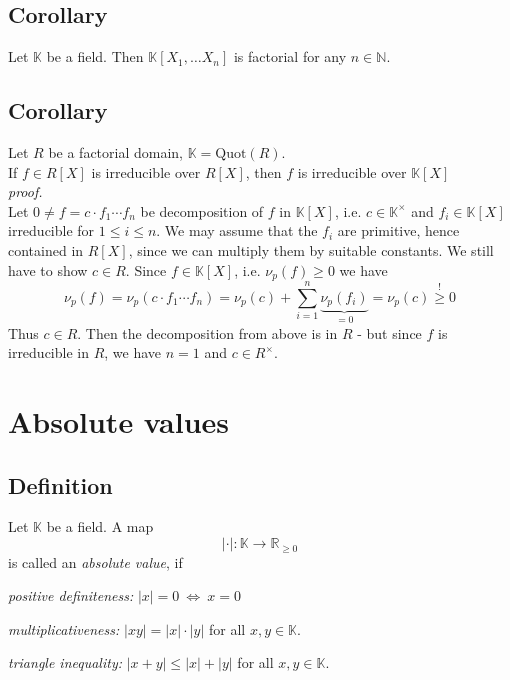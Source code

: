 \documentclass[12pt]{book}
\begin{document}
\begin{spacing}{1.3}
\subsection{Corollary} %
Let $\mathbb{K}$ be a field. Then $\mathbb{K}[X_1, \ldots X_n]$ is factorial for any $n \in \mathbb{N}$.\\


\subsection{Corollary} %
Let $R$ be a factorial domain, $\mathbb{K}=\textrm{Quot}(R)$.\\
If $f \in R[X]$ is irreducible over $R[X]$, then $f$ is irreducible over $\mathbb{K}[X]$\\
\textit{proof.}\\
Let $0\neq f = c \cdot f_1 \cdots f_n$ be decomposition of $f$ in $\mathbb{K}[X]$, i.e. $c \in \mathbb{K}^{\times}$ and $f_i \in \mathbb{K}[X]$ irreducible for $1 \leqslant i \leqslant n$. We may assume that the $f_i$ are primitive, hence contained in  $R[X]$, since we can multiply them by suitable constants. We still have to show $c \in R$. Since $f \in \mathbb{K}[X]$, i.e. $\nu_p(f) \geqslant 0$ we have
$$\nu_p(f)=\nu_p(c \cdot f_1 \cdots f_n)=\nu_p(c) + \sum_{i=1}^n \underbrace{\nu_p(f_i)}_{=0}=\nu_p(c)\overset{!}{\geqslant} 0$$
Thus $c \in R$. Then the decomposition from above is in $R$ - but since $f$ is irreducible in $R$, we have $n=1$ and $c \in R^{\times}$.


\renewcommand*\thesection{\S\ \arabic{section}\quad}
\section{Absolute values}
\renewcommand*\thesection{\arabic{section}}

\subsection{Definition} %
Let $\mathbb{K}$ be a field. A map $$| \cdot |: \mathbb{K} \longrightarrow \mathbb{R}_{\geqslant 0}$$ is called an \textit{absolute value}, if
\begin{compactenum}
\item \textit{positive definiteness:} $|x|=0 \ \Longleftrightarrow \ x=0$
\item \textit{multiplicativeness:} $|xy|=|x|\cdot |y|$ for all $x,y \in \mathbb{K}$.
\item \textit{triangle inequality:} $|x+y| \leqslant |x|+|y|$ for all $x,y \in \mathbb{K}$.
\end{compactenum}


\end{spacing}
\end{document}
